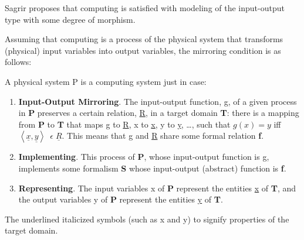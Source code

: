 \documentclass{amsart}
\begin{document}
Sagrir proposes that computing is satisfied with modeling of the input-output type with some degree of morphism.

Assuming that computing is a process of the physical system that transforms (physical) input variables into output variables, the mirroring condition is as follows:




A physical system P is a computing system just in case:

\begin{enumerate}
    \item \textbf{Input-Output Mirroring}. The input-output function, g, of a given process in \textbf{P} preserves a certain relation, \underline{R}, in a target domain \textbf{T}: there is a mapping from \textbf{P} to \textbf{T} that maps g to \underline{R}, x to \underline{x}, y to \underline{y}, \dots , such that $g(x) = y$ iff $\left\langle \underline{x},\underline{y} \right\rangle\ \; \epsilon \; \underline{R}$. This means that g and \underline{R} share some formal relation \textbf{f}.
    \item \textbf{Implementing}. This process of \textbf{P}, whose input-output function is g, implements some formalism \textbf{S} whose input-output (abstract) function is \textbf{f}.
    \item \textbf{Representing}. The input variables x of \textbf{P} represent the entities \underline{x} of \textbf{T}, and the output variables y of \textbf{P} represent the entities \underline{y} of \textbf{T}.
\end{enumerate}

The underlined italicized symbols (such as x and y) to signify properties of the target domain.

\end{document}

